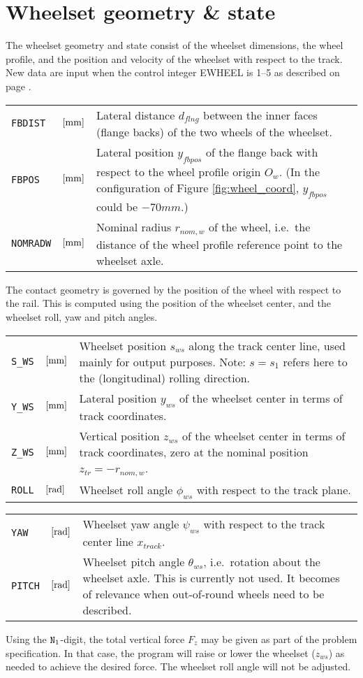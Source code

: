 \documentclass[12pt]{report}
\newenvironment{inputvars}{\vspace{0.4\baselineskip}%

\begin{tabular}{>{\raggedright}p{22mm}p{19mm}p{113mm}}}{
\end{tabular}

}
\newcommand{\inpvar}[3]{{\small\tt #1} & $#2$ & #3 \\[1ex]}
\newcommand{\inpbreak}{\end{inputvars}\begin{inputvars}}
\begin{document}
\section{Wheelset geometry \& state}
\label{sec:wheelset_geom}

The wheelset geometry and state consist of the wheelset dimensions, the
wheel profile, and the position and velocity of the wheelset with respect
to the track. New data are input when the control integer EWHEEL is 1--5
as described on page \pageref{e1-digit}.
\begin{inputvars}
\inpvar{FBDIST}{\bunit{mm}}{Lateral distance $d_{flng}$ between the inner faces
        (flange backs) of the two wheels of the wheelset.}
\inpvar{FBPOS}{\bunit{mm}}{Lateral position $y_{fbpos}$ of the flange back with
        respect to the wheel profile origin $O_w$. (In the configuration of
        Figure \ref{fig:wheel_coord}, $y_{fbpos}$ could be $-70\unit{mm}$.)}
\inpvar{NOMRADW}{\bunit{mm}}{Nominal radius $r_{nom,w}$ of the wheel, i.e.\ the
        distance of the wheel profile reference point to the wheelset axle.}
\end{inputvars}

The contact geometry is governed by the position of the wheel with respect
to the rail. This is computed using the position of the wheelset center,
and the wheelset roll, yaw and pitch angles.
\begin{inputvars}
\inpvar{S\_WS}{\bunit{mm}}{Wheelset position $s_{ws}$ along the track center
        line, used mainly for output purposes. Note: $s=s_1$ refers here to
        the (longitudinal) rolling direction.}
\inpvar{Y\_WS}{\bunit{mm}}{Lateral position $y_{ws}$ of the wheelset center 
        in terms of track coordinates.}
\inpvar{Z\_WS}{\bunit{mm}}{Vertical position $z_{ws}$ of the wheelset center
        in terms of track coordinates, zero at the nominal position
        $z_{tr}=-r_{nom,w}$.}
\inpvar{ROLL}{\bunit{rad}}{Wheelset roll angle $\phi_{ws}$ with respect to the
        track plane.}
\inpbreak
\inpvar{YAW}{\bunit{rad}}{Wheelset yaw angle $\psi_{ws}$ with respect to the
        track center line $x_{track}$.}
\inpvar{PITCH}{\bunit{rad}}{Wheelset pitch angle $\theta_{ws}$, i.e.\ rotation
        about the wheelset axle. This is currently not used. It becomes of
        relevance when out-of-round wheels need to be described.}
\end{inputvars}
Using the ${\tt N}_1$-digit, the total vertical force $F_z$ may be given as
part of the problem specification. In that case, the program will raise or
lower the wheelset ($z_{ws}$) as needed to achieve the desired force. The
wheelset roll angle will not be adjusted.
\end{document}
